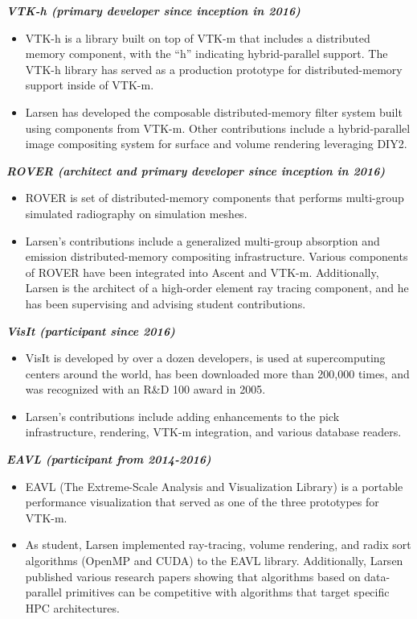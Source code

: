 \documentclass[margin,line]{res}
\begin{document}
\begin{resume}
{\em \textbf{VTK-h (primary developer since inception in  2016)} }
\begin{itemize}
	\item VTK-h is a library built on top of VTK-m that includes a distributed memory component, with the “h” indicating hybrid-parallel support. The VTK-h library has served as a production prototype for distributed-memory support inside of VTK-m.
	\item Larsen has developed the composable distributed-memory filter system built using components from VTK-m. Other contributions include a hybrid-parallel image compositing system for surface and volume rendering leveraging DIY2.
\end{itemize}

{\em \textbf{ROVER (architect and primary developer since inception in 2016)} }
\begin{itemize}
	\item ROVER is set of distributed-memory components that performs multi-group simulated radiography on simulation meshes.
	\item Larsen's contributions include a generalized multi-group absorption and emission distributed-memory compositing infrastructure. Various components of ROVER have been integrated into Ascent and VTK-m. Additionally,
	Larsen is the architect of a high-order element ray tracing component, and he has been supervising and advising student contributions.
\end{itemize}

{\em \textbf{VisIt (participant since 2016)} }
\begin{itemize}
	\item VisIt is developed by over a dozen developers, is used at supercomputing centers around the
	world, has been downloaded more than 200,000 times, and was recognized with an R\&D 100
	award in 2005.
	\item Larsen's contributions include adding enhancements to the pick infrastructure, rendering, VTK-m integration, and various database readers.
\end{itemize}

{\em \textbf{EAVL (participant from 2014-2016)} }
\begin{itemize}
	\item EAVL (The Extreme-Scale Analysis and Visualization Library) is a portable performance visualization that served as one of the three prototypes for VTK-m.
	\item As student, Larsen implemented ray-tracing, volume rendering, and radix sort algorithms (OpenMP and CUDA) to the EAVL library. Additionally, Larsen published various research papers showing that algorithms based on data-parallel primitives can be competitive with algorithms that target specific HPC architectures.
\end{itemize}






\end{resume}
\end{document}
